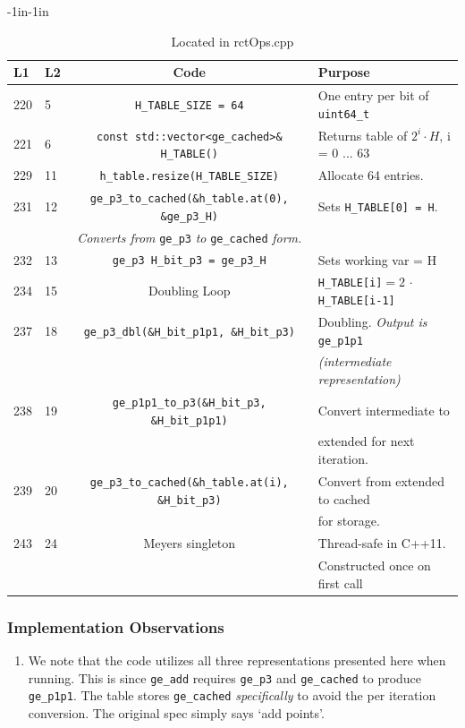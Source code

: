 \documentclass[12pt,titlepage,table]{article}
\begin{document}
\begin{table}[htbp]
\caption{H\_Table Source To Spec Map}
\begin{adjustwidth}{-1in}{-1in}
\centering
{
\begin{tabular}{| l | l | c | l |}
\hline
\textbf{L1} & \textbf{L2} & \textbf{Code} & \textbf{Purpose} \\
\hline
\hline
220 & 5 &\verb+H_TABLE_SIZE = 64+ & One entry per bit of \verb+uint64_t+ \\
221 & 6 &\verb+const std::vector<ge_cached>& H_TABLE()+ &  Returns table of $2^i \cdot H$, i = 0 ... 63 \\
229 & 11 &\verb|h_table.resize(H_TABLE_SIZE)| & Allocate 64 entries. \\
231 & 12 & \verb+ge_p3_to_cached(&h_table.at(0), &ge_p3_H)+ & Sets \verb+H_TABLE[0] = H+. \\
&&\textit{Converts from} \verb+ge_p3+ \textit{to} \verb+ge_cached+ \textit{form.}& \\
232 & 13 &\verb|ge_p3 H_bit_p3 = ge_p3_H| & Sets working var = H \\
234 & 15 & Doubling Loop & \verb+H_TABLE[i]+$ = 2 \, \cdot $ \verb+H_TABLE[i-1]+\\
237 & 18 	&\verb+ge_p3_dbl(&H_bit_p1p1, &H_bit_p3)+ & Doubling. \textit{Output is} \verb+ge_p1p1+\\
&&& \textit{(intermediate representation)}\\
238 & 19 &\verb+ge_p1p1_to_p3(&H_bit_p3, &H_bit_p1p1)+ & Convert intermediate to \\
&&&extended for next iteration.\\
239 & 20 &\verb+ge_p3_to_cached(&h_table.at(i), &H_bit_p3)+ & Convert from extended to cached\\
&&& for storage.\\
243 & 24 & Meyers singleton & Thread-safe in C++11. \\
&&&Constructed once on first call\\
\hline
\end{tabular}}
\end{adjustwidth}
\caption*{Located in rctOps.cpp}
\end{table}

\subsubsection{Implementation Observations}
\begin{enumerate}
\item We note that the code utilizes all three representations presented here when running. This is since \verb+ge_add+ requires \verb+ge_p3+ and \verb+ge_cached+ to produce \verb+ge_p1p1+. The table stores \verb+ge_cached+ \textit{specifically} to avoid the per iteration conversion. The original spec simply says `add points'.
\end{enumerate}
\end{document}
